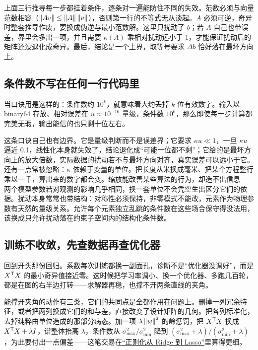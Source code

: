 上面三行推导每一步都挂着条件，逐条对一遍能防住不同的失效。范数必须与向量范数相容（\(\left\lVert Av\right\rVert\le\left\lVert A\right\rVert\left\lVert v\right\rVert\)），否则第一行的不等式无从谈起。\(A\) 必须可逆，奇异时整套推导作废，要换成伪逆与最小范数解。这里只扰动了 \(b\)；若 \(A\) 自己也带误差，界里会多出一项，并且需要 \(\kappa(A)\) 乘相对扰动远小于 1，才能保证扰动后的矩阵还没退化成奇异。最后，结论是一个上界，取等号要求 \(\Delta b\) 恰好落在最坏方向上。

\subsection{条件数不写在任何一行代码里}

当口诀用是这样的：条件数约 \(10^{k}\)，就意味着大约丢掉 \(k\) 位有效数字。输入以 binary64 存放、相对误差在 \(u\approx10^{-16}\) 量级，条件数 \(10^{6}\)，那么即使每一步计算都完美无瑕，输出能信的也只剩十位左右。

这条口诀自己也有边界。它是量级判断而不是误差界；它要求 \(\kappa u\ll1\)，一旦 \(\kappa u\) 逼近 0.1，线性化本身就失效了，结论退化成``可能一位都不剩''；它给的是最坏方向上的放大倍数，实际数据的扰动若不与最坏方向对齐，真实误差可以远小于它。还有一点常被忽略：\(\kappa\) 依赖于变量的单位。把长度从米换成毫米、把某个方程整行乘以一千，算出来的数字都会变。缩放能改善某些算法的行为，却造不出信息——两个模型参数若对观测的影响几乎相同，换一套单位不会凭空生出区分它们的依据。扰动本身常常也带结构：对称性必须保持，非零模式不能改，元素作为物理参数有天然的量级关系。允许每个元素独立乱跳的条件数在这些场合保守得没法用，该换成只允许扰动落在约束子空间内的结构化条件数。

\subsection{训练不收敛，先查数据再查优化器}

回到开头那份回归。系数每次训练都换一副面孔，诊断不是``优化器没调好''，而是 \(X^{\mathsf{T}}X\) 的最小奇异值接近零。这时候把学习率调小、换一个优化器、多跑几百轮，都是在图的右半边打转——求解器再稳，也撑不开两条直线的夹角。

能撑开夹角的动作有三类，它们的共同点是全都作用在问题上。删掉一列冗余特征，或者把两列换成它们的和与差，直接改变了设计矩阵的几何。把各列标准化，去掉纯粹由单位造成的那部分病态。加一项 \(\lambda\left\lVert w\right\rVert^{2}\) 的岭惩罚，把 \(X^{\mathsf{T}}X\) 换成 \(X^{\mathsf{T}}X+\lambda I\)，谱整体抬高 \(\lambda\)，条件数从 \(\sigma_{\max}^{2}/\sigma_{\min}^{2}\) 降到 \((\sigma_{\max}^{2}+\lambda)/(\sigma_{\min}^{2}+\lambda)\)，为此要付出一点偏差——这笔交易在\hyperref[sec:13-Machine-Learning/02-Linear-Models/02]{``正则化从 Ridge 到 Lasso''}里算得更细。

